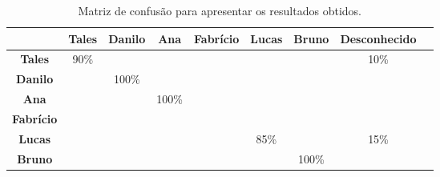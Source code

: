 	\begin{table}[htb]
		\begin{center}
			\caption{Matriz de confusão para apresentar os resultados obtidos.}
			\label{tab:matriz-confusao2}
			\begin{tabular}{|c|c|c|c|c|c|c|c|c|}
				\hline  & \bf Tales & \bf Danilo & \bf Ana & \bf Fabrício & \bf Lucas & \bf Bruno &  \bf Desconhecido\\
				\hline \bf Tales 		& 90\% & 			& 		 & 			&   	 & 			& 10\%		\\
				\hline \bf Danilo 	& 		 & 100\%& 		 & 			&   	 & 			& 		 		\\
				\hline \bf Ana 			& 		 & 			& 100\%& 			&   	 & 			& 		    \\
				\hline \bf Fabrício & 		 & 			& 		 &      &      & 			&      		\\
				\hline \bf Lucas 		& 		 & 			& 		 & 			& 85\% & 			& 15\%		\\
				\hline \bf Bruno 		& 		 & 			& 		 & 			& 		 & 100\%& 		  	\\
				\hline
			\end{tabular}
		\end{center}
	\end{table}


	

